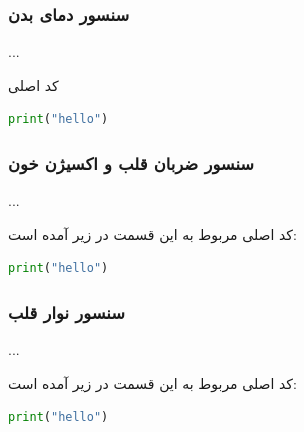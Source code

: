 \subsubsection{سنسور دمای بدن}

...

کد اصلی



\begin{latin}
	\begin{lstlisting}[language=python]
		print("hello")
	\end{lstlisting}
\end{latin}



\subsubsection{سنسور ضربان قلب و اکسیژن خون}

...

کد اصلی مربوط به این قسمت در زیر آمده است:

\begin{latin}
	\begin{lstlisting}[language=python]
		print("hello")
	\end{lstlisting}
\end{latin}

\subsubsection{سنسور نوار قلب}

...

کد اصلی مربوط به این قسمت در زیر آمده است:

\begin{latin}
	\begin{lstlisting}[language=python]
		print("hello")
	\end{lstlisting}
\end{latin}